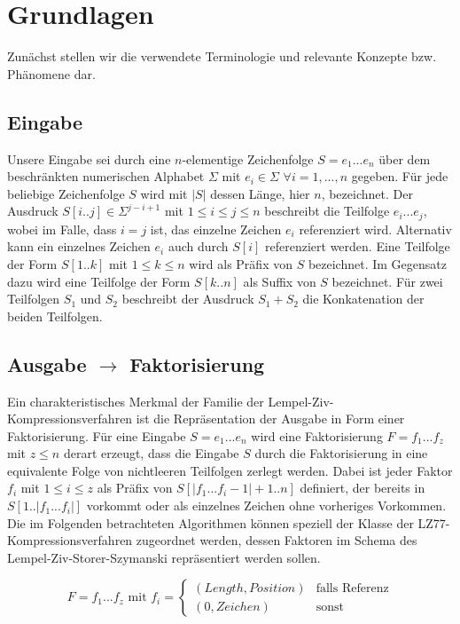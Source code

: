 \chapter{Grundlagen}

Zunächst stellen wir die verwendete Terminologie und relevante Konzepte bzw. Phänomene dar.

\section{Eingabe}
Unsere Eingabe sei durch eine $n$-elementige Zeichenfolge $S=e_1...e_n$ über dem beschränkten numerischen Alphabet $\Sigma$ mit $e_i\in \Sigma$ $\forall i=1,...,n$ gegeben. Für jede
beliebige Zeichenfolge $S$ wird mit $|S|$ dessen Länge, hier $n$, bezeichnet. Der Ausdruck $S[i..j]\in \Sigma^{j-i+1}$ mit $1\leq i\leq j\leq n$ beschreibt die Teilfolge $e_i...e_j$,
wobei im Falle, dass $i=j$ ist, das einzelne Zeichen $e_i$ referenziert wird. Alternativ kann ein einzelnes Zeichen $e_i$ auch durch $S[i]$ referenziert werden. Eine Teilfolge 
der Form $S[1..k]$ mit $1\leq k\leq n$ wird als Präfix von $S$ bezeichnet. Im Gegensatz dazu wird eine Teilfolge der Form $S[k..n]$ als Suffix von $S$ bezeichnet. Für zwei Teilfolgen
$S_1$ und $S_2$ beschreibt der Ausdruck $S_1+S_2$ die Konkatenation der beiden Teilfolgen.

\section{Ausgabe $\rightarrow$ Faktorisierung}
Ein charakteristisches Merkmal der Familie der Lempel-Ziv-Kompressionsverfahren ist die Repräsentation der Ausgabe in Form einer Faktorisierung. Für eine Eingabe $S=e_1...e_n$ 
wird eine Faktorisierung $F=f_1...f_z$ mit $z\leq n$ derart erzeugt, dass die Eingabe $S$ durch die Faktorisierung in eine equivalente Folge von nichtleeren Teilfolgen zerlegt werden. Dabei
ist jeder Faktor $f_i$ mit $1\leq i\leq z$ als Präfix von $S[|f_1...f_i-1|+1..n]$ definiert, der bereits in $S[1..|f_1...f_i|]$ vorkommt oder als einzelnes Zeichen ohne vorheriges Vorkommen.
Die im Folgenden betrachteten Algorithmen können speziell der Klasse der LZ77-Kompressionsverfahren zugeordnet werden, dessen Faktoren im Schema des Lempel-Ziv-Storer-Szymanski repräsentiert
werden sollen. 

\begin{equation} \label{eq:faktor}
    F = f_1...f_z \text{ mit } f_i = \begin{cases} (Length, Position) & \text{falls Referenz} \\ (0, Zeichen) & \text{sonst} \end{cases}
\end{equation}

